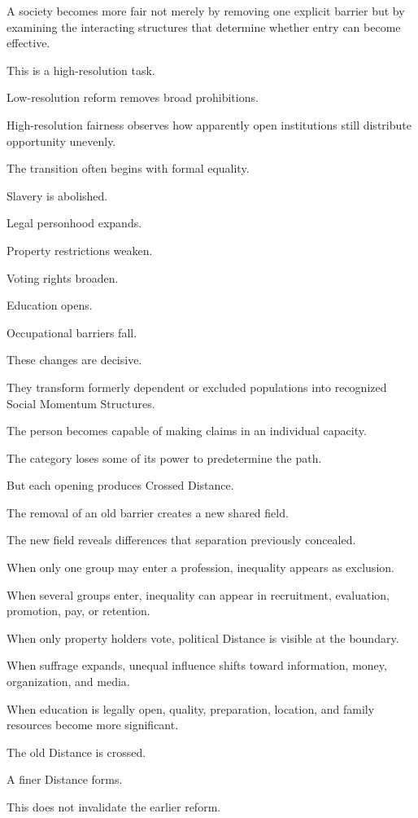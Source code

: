 A society becomes more fair not merely by removing one explicit barrier but by examining the interacting structures that determine whether entry can become effective.

This is a high-resolution task.

Low-resolution reform removes broad prohibitions.

High-resolution fairness observes how apparently open institutions still distribute opportunity unevenly.

The transition often begins with formal equality.

Slavery is abolished.

Legal personhood expands.

Property restrictions weaken.

Voting rights broaden.

Education opens.

Occupational barriers fall.

These changes are decisive.

They transform formerly dependent or excluded populations into recognized Social Momentum Structures.

The person becomes capable of making claims in an individual capacity.

The category loses some of its power to predetermine the path.

But each opening produces Crossed Distance.

The removal of an old barrier creates a new shared field.

The new field reveals differences that separation previously concealed.

When only one group may enter a profession, inequality appears as exclusion.

When several groups enter, inequality can appear in recruitment, evaluation, promotion, pay, or retention.

When only property holders vote, political Distance is visible at the boundary.

When suffrage expands, unequal influence shifts toward information, money, organization, and media.

When education is legally open, quality, preparation, location, and family resources become more significant.

The old Distance is crossed.

A finer Distance forms.

This does not invalidate the earlier reform.

